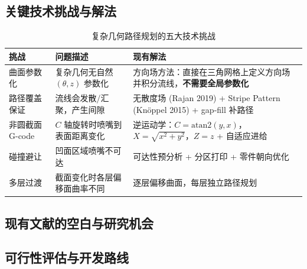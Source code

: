 \documentclass[11pt,a4paper]{article}
\begin{document}
\subsection{关键技术挑战与解法}

\begin{table}[H]
\centering
\small
\begin{tabularx}{\textwidth}{l X X}
\toprule
\textbf{挑战} & \textbf{问题描述} & \textbf{现有解法} \\
\midrule
曲面参数化 & 复杂几何无自然 $(\theta, z)$ 参数化 & 方向场方法：直接在三角网格上定义方向场并积分流线，\textbf{不需要全局参数化} \\
路径覆盖保证 & 流线会发散/汇聚，产生间隙 & 无散度场 (Rajan 2019) + Stripe Pattern (Knöppel 2015) + gap-fill 补路径 \\
非圆截面 G-code & $C$ 轴旋转时喷嘴到表面距离变化 & 逆运动学：$C = \text{atan2}(y,x)$，$X = \sqrt{x^2+y^2}$，$Z = z$ + 自适应进给 \\
碰撞避让 & 凹面区域喷嘴不可达 & 可达性预分析 + 分区打印 + 零件朝向优化 \\
多层过渡 & 截面变化时各层偏移面曲率不同 & 逐层偏移曲面，每层独立路径规划 \\
\bottomrule
\end{tabularx}
\caption{复杂几何路径规划的五大技术挑战}
\end{table}

\subsection{现有文献的空白与研究机会}

\noindent{}

\subsection{可行性评估与开发路线}
\end{document}
